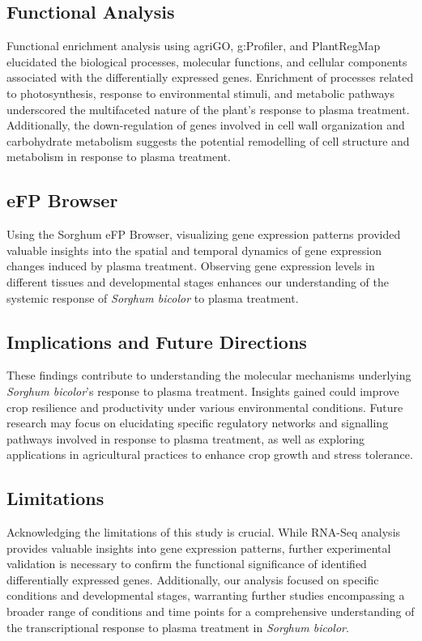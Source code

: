 \documentclass[12pt,letterpaper]{article}
\begin{document}
\subsection{Functional Analysis}

Functional enrichment analysis using agriGO, g:Profiler, and PlantRegMap elucidated the biological processes, molecular functions, and cellular components associated with the differentially expressed genes. Enrichment of processes related to photosynthesis, response to environmental stimuli, and metabolic pathways underscored the multifaceted nature of the plant's response to plasma treatment. Additionally, the down-regulation of genes involved in cell wall organization and carbohydrate metabolism suggests the potential remodelling of cell structure and metabolism in response to plasma treatment.

\subsection{eFP Browser}

Using the Sorghum eFP Browser, visualizing gene expression patterns provided valuable insights into the spatial and temporal dynamics of gene expression changes induced by plasma treatment. Observing gene expression levels in different tissues and developmental stages enhances our understanding of the systemic response of \textit{Sorghum bicolor} to plasma treatment.

\subsection{Implications and Future Directions}

These findings contribute to understanding the molecular mechanisms underlying \textit{Sorghum bicolor}'s response to plasma treatment. Insights gained could improve crop resilience and productivity under various environmental conditions. Future research may focus on elucidating specific regulatory networks and signalling pathways involved in response to plasma treatment, as well as exploring applications in agricultural practices to enhance crop growth and stress tolerance.

\subsection{Limitations}

Acknowledging the limitations of this study is crucial. While RNA-Seq analysis provides valuable insights into gene expression patterns, further experimental validation is necessary to confirm the functional significance of identified differentially expressed genes. Additionally, our analysis focused on specific conditions and developmental stages, warranting further studies encompassing a broader range of conditions and time points for a comprehensive understanding of the transcriptional response to plasma treatment in \textit{Sorghum bicolor}.
\end{document}
